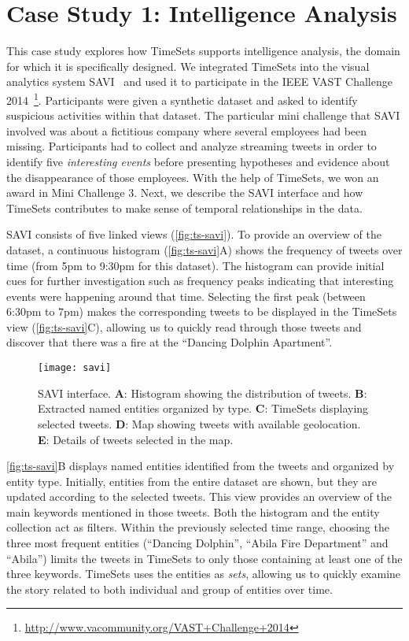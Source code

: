 \section{Case Study 1: Intelligence Analysis}
\label{sub:ts-vast}
This case study explores how TimeSets supports intelligence analysis, the domain for which it is specifically designed. We integrated TimeSets into the visual analytics system SAVI~\cite{Xu2014} and used it to participate in the IEEE VAST Challenge 2014~\footnote{\url{http://www.vacommunity.org/VAST+Challenge+2014}}. Participants were given a synthetic dataset and asked to identify suspicious activities within that dataset. The particular mini challenge that SAVI involved was about a fictitious company where several employees had been missing. Participants had to collect and analyze streaming tweets in order to identify five \emph{interesting events} before presenting hypotheses and evidence about the disappearance of those employees. With the help of TimeSets, we won an award in Mini Challenge 3. Next, we describe the SAVI interface and how TimeSets contributes to make sense of temporal relationships in the data.

SAVI consists of five linked views (\autoref{fig:ts-savi}). To provide an overview of the dataset, a continuous histogram (\autoref{fig:ts-savi}A) shows the frequency of tweets over time (from 5pm to 9:30pm for this dataset). The histogram can provide initial cues for further investigation such as frequency peaks indicating that interesting events were happening around that time. Selecting the first peak (between 6:30pm to 7pm) makes the corresponding tweets to be displayed in the TimeSets view (\autoref{fig:ts-savi}C), allowing us to quickly read through those tweets and discover that there was a fire at the ``Dancing Dolphin Apartment''.

\begin{figure}
	\centering
	\texttt{[image: savi]}
	\caption[SAVI interface]{SAVI interface. \textbf{A}: Histogram showing the distribution of tweets. \textbf{B}: Extracted named entities organized by type. \textbf{C}: TimeSets displaying selected tweets. \textbf{D}: Map showing tweets with available geolocation. \textbf{E}: Details of tweets selected in the map.}
	\label{fig:ts-savi}
\end{figure}

\autoref{fig:ts-savi}B displays named entities identified from the tweets and organized by entity type. Initially, entities from the entire dataset are shown, but they are updated according to the selected tweets. This view provides an overview of the main keywords mentioned in those tweets. Both the histogram and the entity collection act as filters. Within the previously selected time range, choosing the three most frequent entities (``Dancing Dolphin'', ``Abila Fire Department'' and ``Abila'') limits the tweets in TimeSets to only those containing at least one of the three keywords. TimeSets uses the entities as \emph{sets}, allowing us to quickly examine the story related to both individual and group of entities over time.

